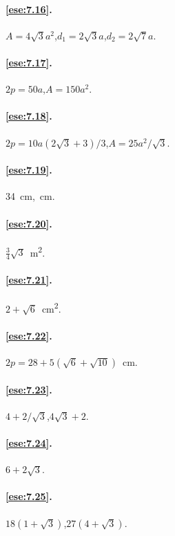 \paragraph{\ref{ese:7.16}.}
\(A=4\sqrt{3}a^2\),\quad \(d_1=2\sqrt{3}a\),\quad \(d_2=2\sqrt{7}a\).

\paragraph{\ref{ese:7.17}.}
\(2p=50a\),\quad \(A=150a^2\).

\paragraph{\ref{ese:7.18}.}
\(2p=10a(2\sqrt{3}+3)/3\),\quad \(A=25a^2/\sqrt{3}\).

\paragraph{\ref{ese:7.19}.}
34~cm,~cm.

\paragraph{\ref{ese:7.20}.}
\(\frac{3}{4}\sqrt{3}\)~m\textsuperscript{2}.

\paragraph{\ref{ese:7.21}.}
\(2+\sqrt{6}\)~cm\textsuperscript{2}.

\paragraph{\ref{ese:7.22}.}
\(2p=28+5(\sqrt{6}+\sqrt{10})\)~cm.

\paragraph{\ref{ese:7.23}.}
\(4+2/\sqrt{3}\),\quad \(4\sqrt{3}+2\).

\paragraph{\ref{ese:7.24}.}
\(6+2\sqrt{3}\).

\paragraph{\ref{ese:7.25}.}
\(18(1+\sqrt{3})\),\quad \(27(4+\sqrt{3})\).

